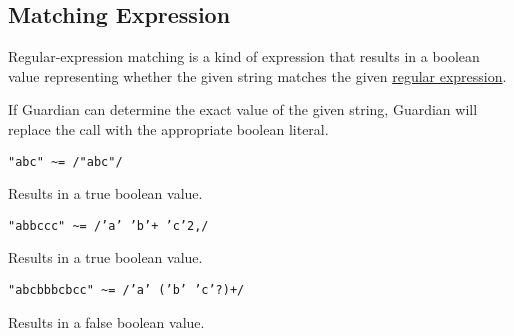 
\subsection{Matching Expression}
{
	Regular-expression matching is a kind of expression that results in
	a boolean value representing whether the given string matches
	the given \hyperref[sec:regex]{regular expression}.
	
	If Guardian can determine the exact value of the given string,
	Guardian will replace the call with the appropriate boolean literal.
	
	\begin{itemize}
	{
		\item[] \texttt{"abc" \~{}= /"abc"/}
		
			Results in a true boolean value.
		
		\item[] \texttt{"abbccc" \~{}= /'a' 'b'+ 'c'{2,}/}
		
			Results in a true boolean value.
		
		\item[] \texttt{"abcbbbcbcc" \~{}= /'a' ('b' 'c'?)+/}
		
			Results in a false boolean value.
	}
	\end{itemize}
}
